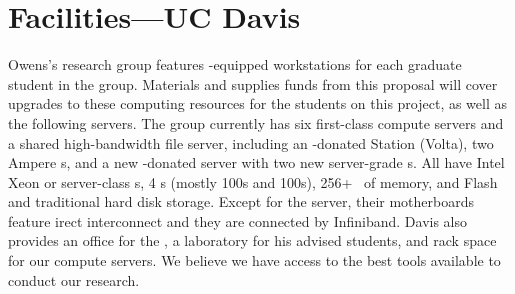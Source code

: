 
\section*{Facilities---UC Davis}

 Owens's research group features -equipped workstations for each graduate student in the group. Materials and supplies funds from this proposal will cover upgrades to these computing resources for the students on this project, as well as the following servers. The group currently has six first-class  compute servers and a shared high-bandwidth file server, including an -donated  Station (Volta), two  Ampere s, and a new -donated server with two new  server-grade s. All have Intel Xeon or  server-class s, 4  s (mostly 100s and 100s), 256+~ of memory, and Flash and traditional hard disk storage. Except for the  server, their motherboards feature irect interconnect and they are connected by Infiniband.  Davis also provides an office for the , a laboratory for his advised students, and rack space for our compute servers. We believe we have access to the best tools available to conduct our research.

